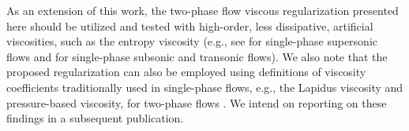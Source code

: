 As an extension of this work, the two-phase flow viscous regularization presented here should be utilized and tested with high-order, less dissipative, artificial viscosities, 
such as the entropy viscosity (e.g., see \cite{jlg_EVM_JCP2011} for single-phase supersonic flows and \cite{Marco_paper_low_mach} for single-phase subsonic and transonic flows). 
We also note that the proposed regularization can also be employed using definitions of viscosity coefficients traditionally used in single-phase flows, e.g., 
the Lapidus viscosity \cite{Lapidus_paper,Lapidus_book} and pressure-based viscosity, for two-phase flows \cite{PBV_book}. We intend on reporting on these findings in 
a subsequent publication. 
%
